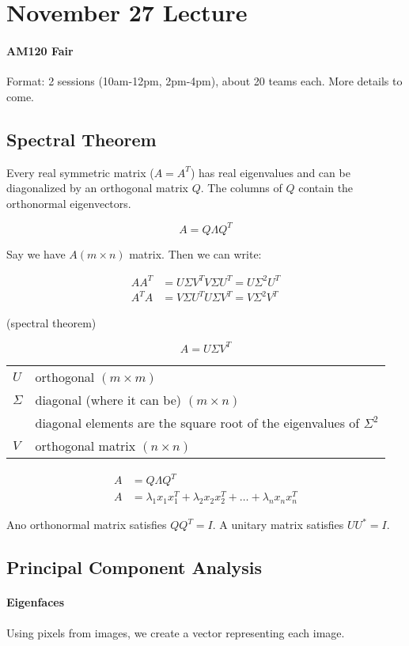 \section{November 27 Lecture}

\paragraph{AM120 Fair} Format: 2 sessions (10am-12pm, 2pm-4pm), about 20 teams each. More details to come.

\subsection{Spectral Theorem}
Every real symmetric matrix ($A = A^T$) has real eigenvalues and can be diagonalized by an orthogonal matrix $Q$. The columns of $Q$ contain the orthonormal eigenvectors.

\[
  A = Q \Lambda Q^T
\]

Say we have $A (m \times n)$ matrix. Then we can write:

\begin{align*}
  A A^T &= U \Sigma V^T V \Sigma U^T = U \Sigma^2 U^T \\
  A^T A &= V \Sigma U^T U \Sigma V^T = V \Sigma^2 V^T
\end{align*}

(spectral theorem)

\[
  A = U \Sigma V^T
\]

\begin{tabular}{ll}
  $U$ & orthogonal $(m \times m)$ \\
  $\Sigma$ & diagonal (where it can be) $(m \times n)$ \\
  & diagonal elements are the square root of the eigenvalues of $\Sigma^2$\\
  $V$ & orthogonal matrix $(n \times n)$
\end{tabular}


\begin{align*}
  A &= Q \Lambda Q^T \\
  A &= \lambda_1x_1x_1^T + \lambda_2x_2x_2^T + \dots + \lambda_nx_nx_n^T
\end{align*}

Ano orthonormal matrix satisfies $Q Q^T = I$. A unitary matrix satisfies $U U^* = I$.

\subsection{Principal Component Analysis}

\paragraph{Eigenfaces} Using pixels from images, we create a vector representing each image.
